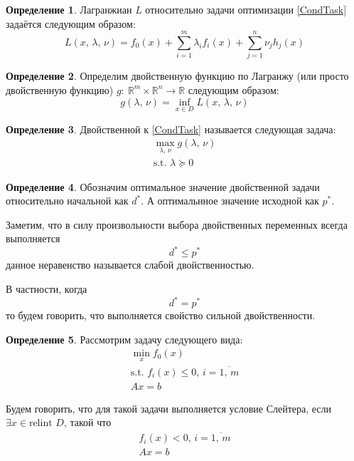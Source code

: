 \documentclass[a4paper,12pt]{article}
\renewcommand{\leq}{\ensuremath{\leqslant}}
\theoremstyle{plain}
\theoremstyle{definition}
\newtheorem{definition}{Определение}[section]
\theoremstyle{remark}
\begin{document}
\begin{definition}
	Лагранжиан $L$ относительно задачи оптимизации \eqref{CondTask} задаётся следующим образом:
	\[
		L(x,\, \lambda,\, \nu) = f_0(x) + \sum_{i = 1}^m \lambda_if_i(x) + \sum_{j = 1}^n\nu_jh_j(x)
	\]
\end{definition}

\begin{definition}
	Определим двойственную функцию по Лагранжу (или просто двойственную функцию) $g:\: \mathbb{R}^m \times \mathbb{R}^n \to \mathbb{R}$ следующим образом:
	\[
		g(\lambda,\, \nu) = \inf_{x \in D} L(x,\, \lambda,\, \nu)
	\]
\end{definition}

\begin{definition}
	Двойственной к \eqref{CondTask} называется следующая задача:
	\begin{align}\label{SecondaryTask}
		\max_{\lambda,\, \nu} g(\lambda,\, \nu) \\
		\text{s.t. } \lambda \succeq 0
	\end{align}
\end{definition}

\begin{definition}
	Обозначим оптимальное значение двойственной задачи относительно начальной как $d^*$. А оптимальнное значение исходной как $p^*$.

	Заметим, что в силу произвольности выбора двойственных переменных всегда выполняется
	\[
		d^* \leq p^*
	\]
	данное неравенство называется слабой двойственностью.

	В частности, когда
	\[
		d^* = p^*
	\]
	то будем говорить, что выполняется свойство сильной двойственности.
\end{definition}

\begin{definition}
	Рассмотрим задачу следующего вида:
	\begin{align}\label{AffCondTask}
		\min_x f_0(x)                                      \\
		\text{s.t. } f_i(x) \leq 0,\, i = \overline{1,\,m} \\
		Ax = b
	\end{align}

	Будем говорить, что для такой задачи выполняется условие Слейтера, если $\exists x \in \text{relint }D$, такой что
	\begin{align*}
		f_i(x) < 0,\, i = \overline{1,\,m} \\
		Ax = b
	\end{align*}
\end{definition}
\end{document}
